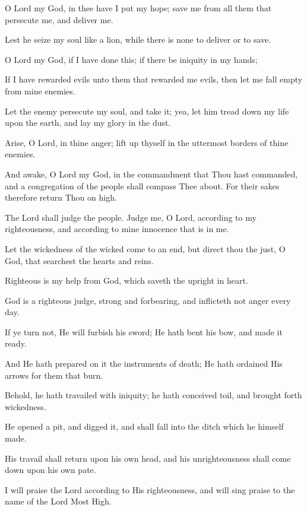 O Lord my God, in thee have I put my hope; save me from all them that persecute me, and deliver me.

Lest he seize my soul like a lion, while there is none to deliver or to save.

O Lord my God, if I have done this; if there be iniquity in my hands;

If I have rewarded evils unto them that rewarded me evils, then let me fall empty from mine enemies.

Let the enemy persecute my soul, and take it; yea, let him tread down my life upon the earth, and lay my glory in the dust.

Arise, O Lord, in thine anger; lift up thyself in the uttermost borders of thine enemies.

And awake, O Lord my God, in the commandment that Thou hast commanded, and a congregation of the people shall compass Thee about. For their sakes therefore return Thou on high.

The Lord shall judge the people. Judge me, O Lord, according to my righteousness, and according to mine innocence that is in me.

Let the wickedness of the wicked come to an end, but direct thou the just, O God, that searchest the hearts and reins.

Righteous is my help from God, which saveth the upright in heart.

God is a righteous judge, strong and forbearing, and inflicteth not anger every day.

If ye turn not, He will furbish his sword; He hath bent his bow, and made it ready.

And He hath prepared on it the instruments of death; He hath ordained His arrows for them that burn.

Behold, he hath travailed with iniquity; he hath conceived toil, and brought forth wickedness.

He opened a pit, and digged it, and shall fall into the ditch which he himself made.

His travail shall return upon his own head, and his unrighteousness shall come down upon his own pate.

I will praise the Lord according to His righteousness, and will sing praise to the name of the Lord Most High.
